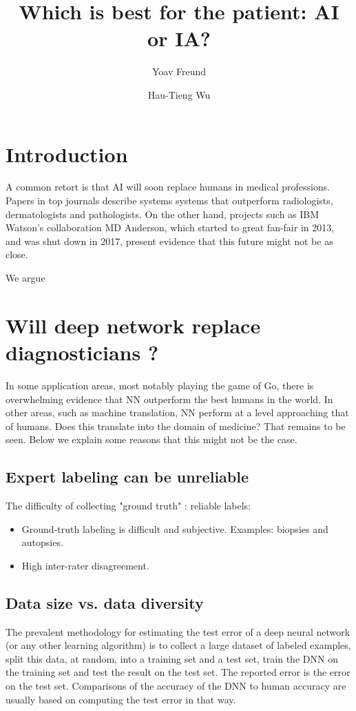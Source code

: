 \documentclass[fleqn,10pt]{wlscirep}
\title{Which is best for the patient: AI or IA?}
\author[1]{Yoav Freund}
\author[2]{Hau-Tieng Wu}
\affil[1]{UCSD, department, city, postcode, country}
\affil[2]{Duke, department, city, postcode, country}
\begin{document}
\flushbottom
\maketitle

\thispagestyle{empty}

\section*{Introduction}
A common retort is that AI will soon replace humans in medical professions. Papers in top journals describe systems 
systems that outperform radiologists, dermatologists and pathologists. On the other hand, projects such as IBM Watson's 
collaboration MD Anderson, which started to great fan-fair in 2013, and was shut down in 2017, present evidence that this future might not be as close.

We argue 


\section{Will deep network replace diagnosticians ?}


In some application areas, most notably playing the game of Go, there is overwhelming evidence that NN outperform the best humans in the world. In other areas, such as machine translation, NN perform at a level approaching that of humans. Does this translate into the domain of medicine? That remains to be seen. Below we explain some reasons that this might not be the case.

\subsection*{Expert labeling can be unreliable \label{sec:UnreliableExperts}}
The difficulty of collecting "ground truth" : reliable labels:
\begin{itemize}
    \item Ground-truth labeling is difficult and subjective. Examples: biopsies and autopsies.
    \item High inter-rater disagreement.
\end{itemize}

\subsection*{Data size vs. data diversity}
The prevalent methodology for estimating the test error of a deep neural network (or any other learning algorithm) is to 
collect a large dataset of labeled examples, split this data, at random, into a training set and a test set, train the DNN on the training set and test the result on the test set. The reported error is the error on the test set. Comparisons of the accuracy of the DNN to human accuracy are usually based on computing the test error in that way.
\end{document}
